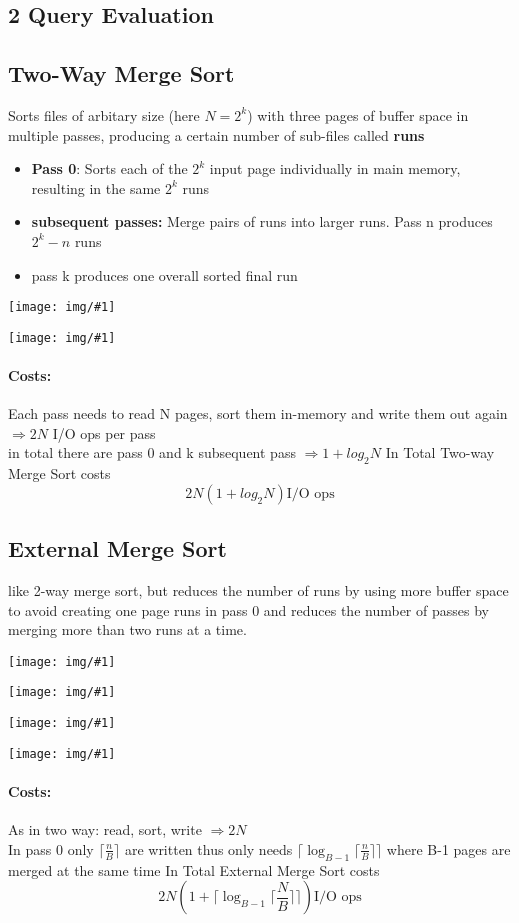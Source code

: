 \documentclass[a4paper]{article}
\newcommand{\img}[1]{\begin{center}
    \texttt{[image: img/\#1]}
\end{center} }
\begin{document}
\begin{twocolumn}
\section{2 Query Evaluation}


\subsection{Two-Way Merge Sort}
Sorts files of arbitary size (here $N=2^k$) with three pages of buffer space in multiple passes, producing a certain number of sub-files called \textbf{runs}
\begin{itemize}
	\item \textbf{Pass 0}: Sorts each of the $2^k$ input page individually in main memory, resulting in the same $2^k$ runs
	\item \textbf{subsequent passes:} Merge pairs of runs into larger runs. Pass n produces $2^k-n$ runs
	\item pass k produces one overall sorted final run
\end{itemize}
\img{2_way_merge_sort.png}
\img{2_way_merge_sort_ex.png}

\paragraph{Costs:} Each pass needs to read N pages, sort them in-memory and write them out again $\Rightarrow 2N$ I/O ops per pass \\
in total there are pass 0 and k subsequent pass $\Rightarrow 1 + log_2 {N}$
In Total Two-way Merge Sort costs \[ 2 N (1+ log_2 {N}) \text{I/O ops}\]

\subsection{External Merge Sort}
like 2-way merge sort, but reduces the number of runs by using more buffer space to avoid creating one page runs in pass 0 and reduces the number of passes by merging more than two runs at a time.
\img{external_ms.png}
\img{external_ms_mem.png}
\img{external_ms_buf.png}
\img{external_ms_ex.png}

\paragraph{Costs:} As in two way: read, sort, write $\Rightarrow 2N$ \\
In pass 0 only $\lceil \frac{n}{B}\rceil$ are written thus only needs $\lceil \log_{B-1} \lceil \frac{n}{B}\rceil\rceil$ where B-1 pages are merged at the same time
In Total External Merge Sort costs \[ 2 N (1+ \lceil \log_{B-1} \lceil \frac{N}{B}\rceil\rceil) \text{I/O ops}\]


\end{twocolumn}
\end{document}
